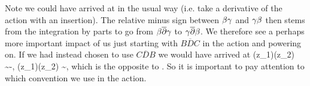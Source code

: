 Note we could have arrived at  in the usual way (i.e. take a derivative of the action with an insertion). The relative minus sign between $\beta\gamma$ and $\gamma\beta$ then stems from the integration by parts to go from $\beta\overline{\partial}\gamma$ to $\gamma\overline{\partial}\beta$. We therefore see a perhaps more important impact of us just starting with $B\overline{D}C$ in the action and powering on. If we had instead chosen to use $C\overline{D}B$ we would have arrived at 
\bse 
    \g(z_1)\beta(z_2) \sim -, \qand \beta(z_1)\g(z_2) \sim {},
\ese 
which is the opposite to . So it is important to pay attention to which convention we use in the action. 